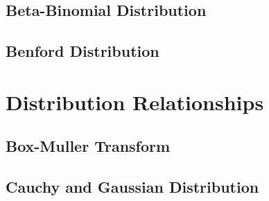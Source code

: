 \documentclass[11pt]{report} %
\begin{document}
\subsection{Beta-Binomial Distribution}

\subsection{Benford Distribution}

\section{Distribution Relationships}

\subsection{Box-Muller Transform}

\subsection{Cauchy and Gaussian Distribution}
\end{document}
